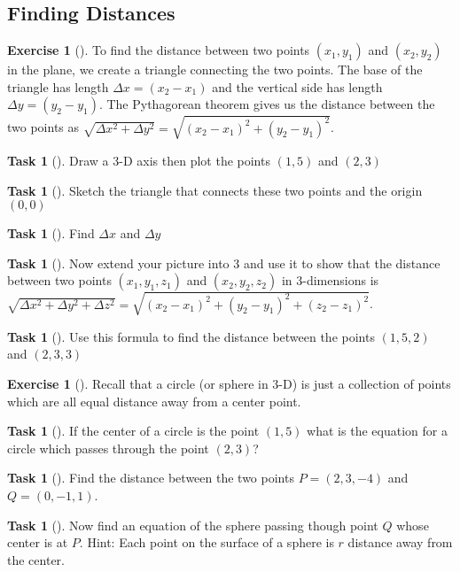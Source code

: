 \documentclass[10pt,]{book}
\theoremstyle{plain}
\theoremstyle{definition}
\theoremstyle{definition}
\theoremstyle{definition}
\theoremstyle{definition}
\newtheorem{exploration}[project]{Exercise}
\newtheorem{task}[project]{Task}
\theoremstyle{definition}
\numberwithin{equation}{section}
\begin{document}
\subsection[{Finding Distances}]{Finding Distances}\label{subsection-4}
\begin{exploration}[]\label{exploration-19}
To find the distance between two points \((x_1,y_1)\) and \((x_2,y_2)\) in the plane, we create a triangle connecting the two points. The base of the triangle has length \(\Delta x=(x_2-x_1)\) and the vertical side has length \(\Delta y=(y_2-y_1)\). The Pythagorean theorem gives us the distance between the two points as \(\sqrt{\Delta x^2+\Delta y^2}=\sqrt{(x_2-x_1)^2+(y_2-y_1)^2}\).%
\begin{task}[]\label{task-25}
Draw a 3-D axis then plot the points \((1,5)\) and \((2,3)\)%
\end{task}
\begin{task}[]\label{task-26}
Sketch the triangle that connects these two points and the origin \textemdash{} \((0,0)\)%
\end{task}
\begin{task}[]\label{task-27}
Find \(\Delta x\) and \(\Delta y\)%
\end{task}
\begin{task}[]\label{task-28}
Now extend your picture into 3 and use it to show that the distance between two points \((x_1,y_1,z_1)\) and \((x_2,y_2,z_2)\) in 3-dimensions is \(\sqrt{\Delta x^2+\Delta y^2+\Delta z^2}=\sqrt{(x_2-x_1)^2+(y_2-y_1)^2+(z_2-z_1)^2}\).%
\end{task}
\begin{task}[]\label{task-29}
Use this formula to find the distance between the points \((1,5,2)\) and \((2,3,3)\)%
\end{task}
\end{exploration}
\begin{exploration}[]\label{exploration-20}
Recall that a circle (or sphere in 3-D) is just a collection of points which are all equal distance away from a center point.%
\begin{task}[]\label{task-30}
If the center of a circle is the point \((1,5)\) what is the equation for a circle which passes through the point \((2,3)\)?%
\end{task}
\begin{task}[]\label{task-31}
Find the distance between the two points \(P=(2,3,-4)\) and \(Q=(0,-1,1)\).%
\end{task}
\begin{task}[]\label{task-32}
Now find an equation of the sphere passing though point \(Q\) whose center is at \(P\). Hint: Each point on the surface of a sphere is \(r\) distance away from the center.%
\end{task}
\end{exploration}
\end{document}
